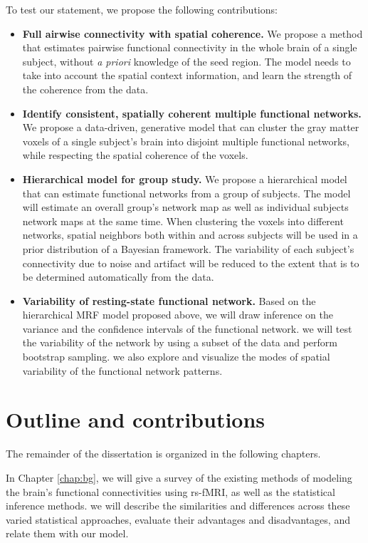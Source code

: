 To test our statement, we propose the following contributions:
\begin{itemize}
  \item \textbf{Full airwise connectivity with spatial coherence.} We propose a
    method that estimates pairwise functional connectivity in the whole brain of
    a single subject, without \emph{a priori} knowledge of the seed region. The
    model needs to take into account the spatial context information, and learn
    the strength of the coherence from the data.

  \item \textbf{Identify consistent, spatially coherent multiple functional
    networks.} We propose a data-driven, generative model that can cluster the
    gray matter voxels of a single subject's brain into disjoint multiple
    functional networks, while respecting the spatial coherence of the voxels.

  \item \textbf{Hierarchical model for group study.} We propose a hierarchical
    model that can estimate functional networks from a group of subjects. The
    model will estimate an overall group's network map as well as individual
    subjects network maps at the same time. When clustering the voxels into
    different networks, spatial neighbors both within and across subjects will
    be used in a prior distribution of a Bayesian framework. The variability of
    each subject's connectivity due to noise and artifact will be reduced to the
    extent that is to be determined automatically from the data.

  \item \textbf{Variability of resting-state functional network. } Based on
    the hierarchical MRF model proposed above, we will draw inference on the
    variance and the confidence intervals of the functional network. we will
    test the variability of the network by using a subset of the data and
    perform bootstrap sampling. we also explore and visualize the modes of
    spatial variability of the functional network patterns.
\end{itemize}

\section{Outline and contributions}
The remainder of the dissertation is organized in the following chapters. 

In Chapter \ref{chap:bg}, we will give a survey of the existing methods of
modeling the brain's functional connectivities using rs-fMRI, as well as the
statistical inference methods. we will describe the similarities and differences
across these varied statistical approaches, evaluate their advantages and
disadvantages, and relate them with our model.

